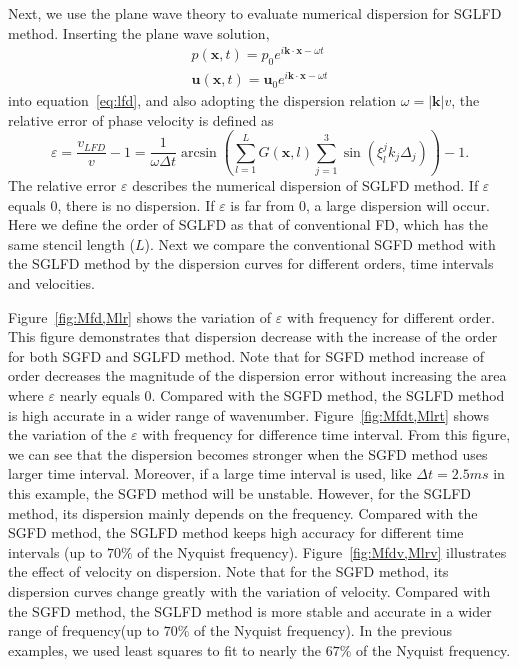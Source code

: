 Next, we use the plane wave theory to evaluate numerical dispersion for SGLFD method. Inserting the plane wave solution,
\begin{equation}
\begin{array}{l}
\label{plane}
\displaystyle p(\mathbf{x},t)=p_0e^{i\mathbf{k}\cdot\mathbf{x}-\omega t} \\
\displaystyle \mathbf{u}(\mathbf{x},t)=\mathbf{u}_0e^{i\mathbf{k}\cdot\mathbf{x}-\omega t}
\end{array}
\end{equation} 
into equation~\ref{eq:lfd}, and also adopting the dispersion relation $\omega=|\mathbf{k}|v$, the relative error of phase velocity is defined as
\begin{equation}
\label{phvel}
\displaystyle \varepsilon=\frac{v_{LFD}}{v}-1=\frac{1}{\omega\Delta t}\arcsin\left( \sum\limits_{l=1}^LG(\mathbf{x},l)\sum\limits_{j=1}^3\sin(\xi_l^jk_j\Delta_j)\right)-1.
\end{equation}
The relative error $\varepsilon$ describes the numerical dispersion of SGLFD method. If $\varepsilon$ equals $0$, there is no dispersion. If $\varepsilon$ is far from 0, a large dispersion will occur. Here we define the order of SGLFD as that of conventional FD, which has the same stencil length ($L$). Next we compare the conventional SGFD method with the SGLFD method by the dispersion curves for different orders, time intervals and velocities.

Figure~\ref{fig:Mfd,Mlr} shows the variation of $\varepsilon$ with frequency for different order. This figure demonstrates that dispersion decrease with the increase of the order for both SGFD and SGLFD method. Note that for SGFD method increase of order decreases the magnitude of the dispersion error without increasing the area where $\varepsilon$ nearly equals 0. Compared with the SGFD method, the SGLFD method is high accurate in a wider range of wavenumber.
Figure~\ref{fig:Mfdt,Mlrt} shows the variation of the $\varepsilon$ with frequency for difference time interval. From this figure, we can see that the dispersion becomes stronger when the SGFD method uses larger time interval. Moreover, if a large time interval is used, like $\Delta t=2.5ms$ in this example, the SGFD method will be unstable. However, for the SGLFD method, its dispersion mainly depends on the frequency. Compared with the SGFD method, the SGLFD method keeps high accuracy for different time intervals (up to $70\%$ of the Nyquist frequency).
Figure~\ref{fig:Mfdv,Mlrv} illustrates the effect of velocity on dispersion. Note that for the SGFD method, its dispersion curves change greatly with the variation of velocity. Compared with the SGFD method, the SGLFD method is more stable and accurate in a wider range of frequency(up to $70\%$ of the Nyquist frequency).
In the previous examples, we used least squares to fit to nearly the $67\%$ of the Nyquist frequency.

